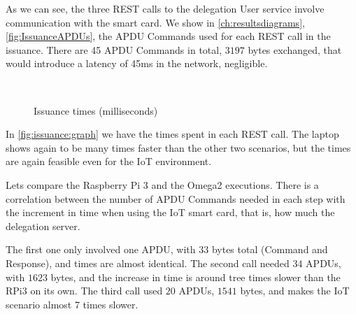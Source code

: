 \documentclass[journal]{IEEEtran}
\begin{document}
As we can see, the three REST calls to the delegation User service involve communication with the smart card. We show in \autoref{ch:resultsdiagrams}, \autoref{fig:IssuanceAPDUs}, the APDU Commands used for each REST call in the issuance.
There are 45 APDU Commands in total, $3197$ bytes exchanged, that would introduce a latency of 45ms in the network, negligible.


\begin{figure}[bth]
	\myfloatalign
	 \quad
	 \\
	\caption{Issuance times (milliseconds)}
	\label{fig:issuance:graph}
\end{figure}

In \autoref{fig:issuance:graph} we have the times spent in each REST call. The laptop shows again to be many times faster than the other two scenarios, but the times are again feasible even for the IoT environment.

Lets compare the Raspberry Pi 3 and the Omega2 executions. There is a correlation between the number of APDU Commands needed in each step with the increment in time when using the IoT smart card, that is, how much the delegation server.

The first one only involved one APDU, with $33$ bytes total (Command and Response), and times are almost identical. The second call needed $34$ APDUs, with $1623$ bytes, and the increase in time is around tree times slower than the RPi3 on its own. The third call used $20$ APDUs, $1541$ bytes, and makes the IoT scenario almost 7 times slower.
\end{document}
